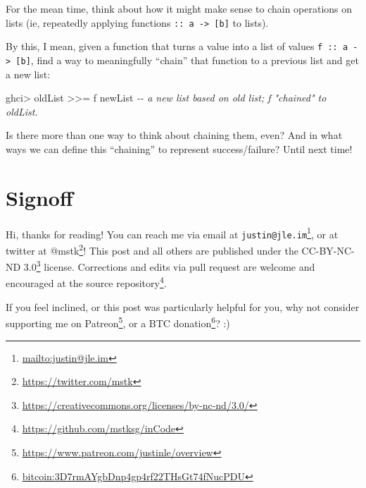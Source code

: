 \documentclass[]{article}
\newenvironment{Shaded}{}{}
\newcommand{\CommentTok}[1]{\textcolor[rgb]{0.38,0.63,0.69}{\textit{#1}}}
\newcommand{\NormalTok}[1]{#1}
\newcommand{\OperatorTok}[1]{\textcolor[rgb]{0.40,0.40,0.40}{#1}}
\renewcommand{\href}[2]{#2\footnote{\url{#1}}}
\begin{document}
For the mean time, think about how it might make sense to chain operations on
lists (ie, repeatedly applying functions
\texttt{::\ a\ -\textgreater{}\ {[}b{]}} to lists).

By this, I mean, given a function that turns a value into a list of values
\texttt{f\ ::\ a\ -\textgreater{}\ {[}b{]}}, find a way to meaningfully
``chain'' that function to a previous list and get a new list:

\begin{Shaded}
\begin{Highlighting}[]
\NormalTok{ghci}\OperatorTok{>}\NormalTok{ oldList }\OperatorTok{>>=}\NormalTok{ f}
\NormalTok{newList             }\CommentTok{{-}{-} a new list based on old list; f "chained" to \textasciigrave{}oldList\textasciigrave{}.}
\end{Highlighting}
\end{Shaded}

Is there more than one way to think about chaining them, even? And in what ways
we can define this ``chaining'' to represent success/failure? Until next time!

\hypertarget{signoff}{%
\section{Signoff}\label{signoff}}

Hi, thanks for reading! You can reach me via email at
\href{mailto:justin@jle.im}{\nolinkurl{justin@jle.im}}, or at twitter at
\href{https://twitter.com/mstk}{@mstk}! This post and all others are published
under the \href{https://creativecommons.org/licenses/by-nc-nd/3.0/}{CC-BY-NC-ND
3.0} license. Corrections and edits via pull request are welcome and encouraged
at \href{https://github.com/mstksg/inCode}{the source repository}.

If you feel inclined, or this post was particularly helpful for you, why not
consider \href{https://www.patreon.com/justinle/overview}{supporting me on
Patreon}, or a \href{bitcoin:3D7rmAYgbDnp4gp4rf22THsGt74fNucPDU}{BTC donation}?
:)
\end{document}
